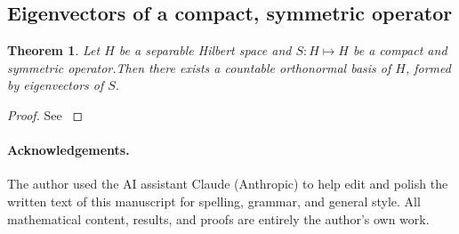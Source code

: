 \documentclass[10pt,a4paper]{article}
\newtheorem{theorem}{Theorem}[section]
\numberwithin{equation}{section}
\begin{document}
\subsection{Eigenvectors of a compact, symmetric operator}
\begin{theorem}\label{thm:spectrum-compact-symmetric}
Let $H$ be a separable Hilbert space and $S:H\mapsto H$ be a compact and symmetric operator.Then there exists a countable orthonormal basis of $H$, formed by eigenvectors of $S$.
\end{theorem}
\begin{proof}
  See \cite[Appendix E, Theorem 7]{Ev10}  
\end{proof}
\paragraph{Acknowledgements.}
 
The author used the AI assistant Claude (Anthropic) to help edit and polish
the written text of this manuscript for spelling, grammar, and general style.
All mathematical content, results, and proofs are entirely the author's own work.





 
\end{document}
